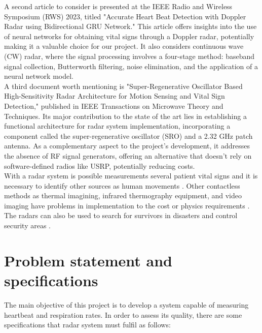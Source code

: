 \documentclass[lettersize,journal]{IEEEtran}
\begin{document}
A second article to consider is presented at the IEEE Radio and Wireless Symposium (RWS) 2023, titled "Accurate Heart Beat Detection with Doppler Radar using Bidirectional GRU Network."\cite{luAccurateHeartBeat2023a} This article offers insights into the use of neural networks for obtaining vital signs through a Doppler radar, potentially making it a valuable choice for our project. It also considers continuous wave (CW) radar, where the signal processing involves a four-stage method: baseband signal collection, Butterworth filtering, noise elimination, and the application of a neural network model.\\


A third document worth mentioning is "Super-Regenerative Oscillator Based High-Sensitivity Radar Architecture for Motion Sensing and Vital Sign Detection,"\cite{yuanSuperregenerativeOscillatorbasedHighsensitivity2021} published in IEEE Transactions on Microwave Theory and Techniques. Its major contribution to the state of the art lies in establishing a functional architecture for radar system implementation, incorporating a component called the super-regenerative oscillator (SRO) and a 2.32 GHz patch antenna. As a complementary aspect to the project's development, it addresses the absence of RF signal generators, offering an alternative that doesn't rely on software-defined radios like USRP, potentially reducing costs.\\

With a radar system is possible measurements several patient vital signs and it is necessary to identify other sources as human movements \cite{f.kraiemDopplerRadarArchitecture2019}. Other contactless methods as thermal imagining, infrared thermography equipment, and video imaging have problems in implementation to the cost or physics requirements \cite{f.kraiemDopplerRadarArchitecture2019}. The radars can also be used to search for survivors in disasters and control security areas \cite{f.kraiemDopplerRadarArchitecture2019}.        



\section{Problem statement and specifications}

The main objective of this project is to develop a system capable of measuring heartbeat and respiration rates. In order to assess its quality, there are some specifications that radar system must fulfil as follows:
\end{document}
